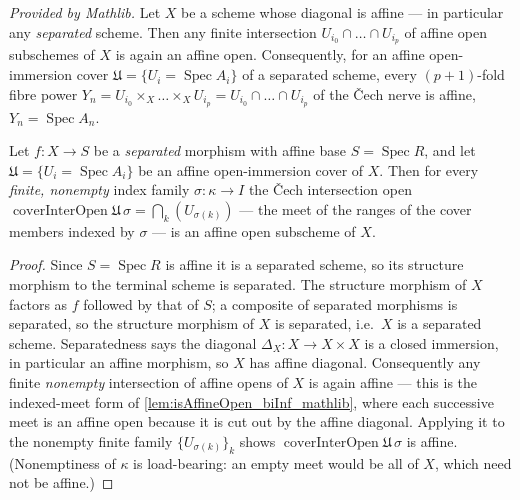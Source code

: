 \begin{lemma}
  \label{lem:isAffineOpen_biInf_mathlib}
  \mathlibok
  \textit{Provided by Mathlib.}
  Let \(X\) be a scheme whose diagonal is affine --- in particular any \emph{separated}
  scheme. Then any finite
  intersection \(U_{i_0} \cap \dots \cap U_{i_p}\) of affine open subschemes of \(X\) is
  again an affine open. Consequently, for an affine open-immersion cover
  \(\mathfrak{U} = \{U_i = \operatorname{Spec} A_i\}\) of a separated scheme, every
  \((p+1)\)-fold fibre power \(Y_n = U_{i_0} \times_X \dots \times_X U_{i_p} =
  U_{i_0} \cap \dots \cap U_{i_p}\) of the {\v C}ech nerve is affine,
  \(Y_n = \operatorname{Spec} A_n\).
\end{lemma}

\begin{lemma}

  \label{lem:cech_interopen_isaffine}
  Let \(f : X \to S\) be a \emph{separated} morphism with affine base
  \(S = \operatorname{Spec} R\), and let \(\mathfrak{U} = \{U_i = \operatorname{Spec} A_i\}\)
  be an affine open-immersion cover of \(X\). Then for every \emph{finite, nonempty} index
  family \(\sigma : \kappa \to I\) the {\v C}ech intersection open
  \(\operatorname{coverInterOpen}\mathfrak{U}\,\sigma = \bigcap_k (U_{\sigma(k)})\) --- the
  meet of the ranges of the cover members indexed by \(\sigma\) --- is an affine open
  subscheme of \(X\).
\end{lemma}
\begin{proof}
  Since \(S = \operatorname{Spec} R\) is affine it is a separated scheme, so its structure
  morphism to the terminal scheme is separated. The structure morphism of \(X\) factors as
  \(f\) followed by that of \(S\); a composite of separated morphisms is separated, so the
  structure morphism of \(X\) is separated, i.e.\ \(X\) is a separated scheme. Separatedness
  says the diagonal \(\Delta_X : X \to X \times X\) is a closed immersion, in particular an
  affine morphism, so \(X\) has affine diagonal. Consequently any finite \emph{nonempty}
  intersection of affine opens of \(X\) is again affine --- this is the indexed-meet form of
  \cref{lem:isAffineOpen_biInf_mathlib}, where each successive meet is an affine open because
  it is cut out by the affine diagonal. Applying it to the nonempty finite family
  \(\{U_{\sigma(k)}\}_k\) shows \(\operatorname{coverInterOpen}\mathfrak{U}\,\sigma\) is
  affine. (Nonemptiness of \(\kappa\) is load-bearing: an empty meet would be all of \(X\),
  which need not be affine.)
\end{proof}

